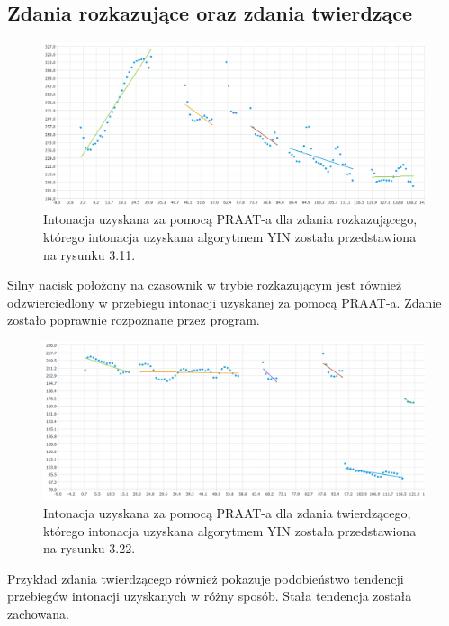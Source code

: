 \documentclass[a4paper,12 pt]{report}
\begin{document}
\subsection{Zdania rozkazujące oraz zdania twierdzące}
\begin{figure}[h]
\centering
\includegraphics[scale=0.6]{rozkaz_1_kob_25.png}
\caption{Intonacja uzyskana za pomocą PRAAT-a dla zdania rozkazującego, którego intonacja uzyskana algorytmem YIN została przedstawiona na rysunku 3.11.}
\end{figure}
\FloatBarrier

Silny nacisk położony na czasownik w trybie rozkazującym jest również odzwierciedlony w przebiegu intonacji uzyskanej za pomocą PRAAT-a. Zdanie zostało poprawnie rozpoznane przez program.

\begin{figure}[h]
\centering
\includegraphics[scale=0.6]{tw_1_praat.png}
\caption{Intonacja uzyskana za pomocą PRAAT-a dla zdania twierdzącego, którego intonacja uzyskana algorytmem YIN została przedstawiona na rysunku 3.22.}
\end{figure}
\FloatBarrier
Przykład zdania twierdzącego również pokazuje podobieństwo tendencji przebiegów intonacji uzyskanych w różny sposób. Stała tendencja została zachowana.
\end{document}
